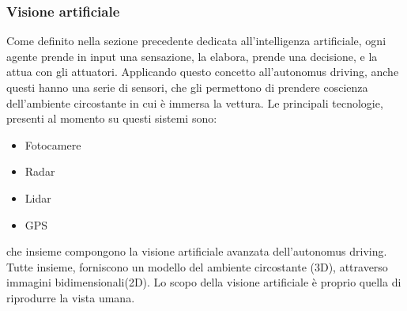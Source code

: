 \documentclass[14pt]{extarticle}
\begin{document}
\subsubsection{Visione artificiale}
Come definito nella sezione precedente dedicata all'intelligenza artificiale, ogni agente prende in input una sensazione, la elabora, prende una decisione, e la attua con gli attuatori. Applicando questo concetto all'autonomus driving, anche questi hanno una serie di sensori, che gli permettono di prendere coscienza dell'ambiente circostante in cui è immersa la vettura.
Le principali tecnologie, presenti al momento su questi sistemi sono\cite{das2018risk}:
\begin{itemize}
\item Fotocamere
\item Radar
\item Lidar
\item GPS
\end{itemize}
che insieme compongono la visione artificiale avanzata dell'autonomus driving.
Tutte insieme, forniscono un modello del ambiente circostante (3D),  attraverso immagini bidimensionali(2D).
Lo scopo della visione artificiale è proprio quella di riprodurre la vista umana.\cite{wiki:visart}
\end{document}
